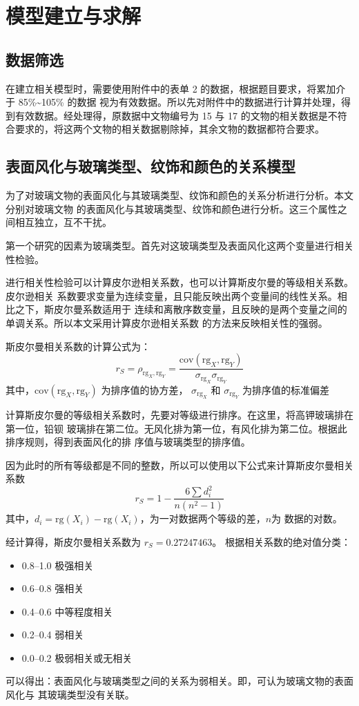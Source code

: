 \documentclass[withoutpreface,bwprint]{cumcmthesis} %
\begin{document}
\section{模型建立与求解}
\subsection{数据筛选}
在建立相关模型时，需要使用附件中的表单 2 的数据，根据题目要求，将累加介于 85\%\~{}105\% 的数据
视为有效数据。所以先对附件中的数据进行计算并处理，得到有效数据。经处理得，原数据中文物编号为 15
与 17 的文物的相关数据是不符合要求的，将这两个文物的相关数据剔除掉，其余文物的数据都符合要求。
\subsection{表面风化与玻璃类型、纹饰和颜色的关系模型}
为了对玻璃文物的表面风化与其玻璃类型、纹饰和颜色的关系分析进行分析。本文分别对玻璃文物
的表面风化与其玻璃类型、纹饰和颜色进行分析。这三个属性之间相互独立，互不干扰。

第一个研究的因素为玻璃类型。首先对这玻璃类型及表面风化这两个变量进行相关性检验。

进行相关性检验可以计算皮尔逊相关系数，也可以计算斯皮尔曼的等级相关系数。皮尔逊相关
系数要求变量为连续变量，且只能反映出两个变量间的线性关系。相比之下，斯皮尔曼系数适用于
连续和离散序数变量，且反映的是两个变量之间的单调关系。所以本文采用计算皮尔逊相关系数
的方法来反映相关性的强弱。

斯皮尔曼相关系数的计算公式为：
\[
    r_{S} = \rho_{\mathrm{rg}_X,\mathrm{rg}_Y} =
    \frac{\mathrm{cov}(\mathrm{rg}_X,\mathrm{rg}_Y)}
    {\sigma_{\mathrm{rg}_X}\sigma_{\mathrm{rg}_Y}}
\]
其中，$\mathrm{cov}(\mathrm{rg}_X,\mathrm{rg}_Y)$ 为排序值的协方差，
$\sigma_{\mathrm{rg}_X}$ 和 $\sigma_{\mathrm{rg}_Y}$ 为排序值的标准偏差

计算斯皮尔曼的等级相关系数时，先要对等级进行排序。在这里，将高钾玻璃排在第一位，铅钡
玻璃排在第二位。无风化排为第一位，有风化排为第二位。根据此排序规则，得到表面风化的排
序值与玻璃类型的排序值。

因为此时的所有等级都是不同的整数，所以可以使用以下公式来计算斯皮尔曼相关系数
\[
    r_S = 1 - \frac{6\sum d_i^2}{n(n^2-1)}
\]
其中，$d_i = \mathrm{rg}(X_i) - \mathrm{rg}(X_i)$，为一对数据两个等级的差，$n$为
数据的对数。

经计算得，斯皮尔曼相关系数为 $r_S = 0.27247463$。
根据相关系数的绝对值分类：
\begin{itemize}
    \item 0.8--1.0 极强相关
    \item 0.6--0.8 强相关
    \item 0.4--0.6 中等程度相关
    \item 0.2--0.4 弱相关
    \item 0.0--0.2 极弱相关或无相关
\end{itemize}
可以得出：表面风化与玻璃类型之间的关系为弱相关。即，可认为玻璃文物的表面风化与
其玻璃类型没有关联。
\end{document}
